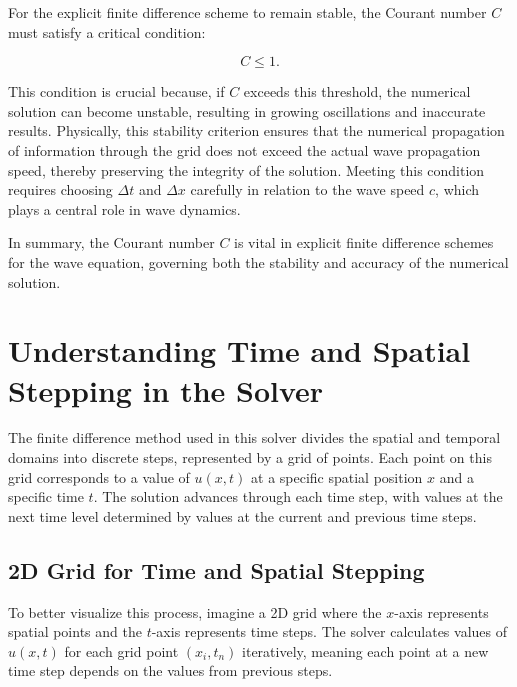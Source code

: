 \documentclass{article}
\begin{document}
			For the explicit finite difference scheme to remain stable, the Courant number $C$ must satisfy a critical condition: 
			
			\begin{equation}
				C \leq 1.
			\end{equation}
			
			This condition is crucial because, if $C$ exceeds this threshold, the numerical solution can become unstable, resulting in growing oscillations and inaccurate results. Physically, this stability criterion ensures that the numerical propagation of information through the grid does not exceed the actual wave propagation speed, thereby preserving the integrity of the solution. Meeting this condition requires choosing $\Delta t$ and $\Delta x$ carefully in relation to the wave speed $c$, which plays a central role in wave dynamics.
			
			In summary, the Courant number $C$ is vital in explicit finite difference schemes for the wave equation, governing both the stability and accuracy of the numerical solution.
			

	
	
	\section{Understanding Time and Spatial Stepping in the Solver}
	
	The finite difference method used in this solver divides the spatial and temporal domains into discrete steps, represented by a grid of points. Each point on this grid corresponds to a value of $u(x, t)$ at a specific spatial position $x$ and a specific time $t$. The solution advances through each time step, with values at the next time level determined by values at the current and previous time steps.
	
		\subsection{2D Grid for Time and Spatial Stepping}
		
		To better visualize this process, imagine a 2D grid where the $x$-axis represents spatial points and the $t$-axis represents time steps. The solver calculates values of $u(x, t)$ for each grid point $(x_i, t_n)$ iteratively, meaning each point at a new time step depends on the values from previous steps.
		
\end{document}
